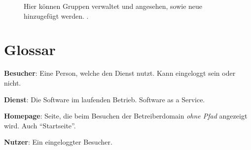 \documentclass[parskip=full,11pt,twoside]{scrartcl}
\begin{document}
\begin{figure}[hb]
		\caption{\label{fig:groups}
			Hier können Gruppen verwaltet und angesehen, sowie neue hinzugefügt werden.
			.
		}
\end{figure}

\section{Glossar}

\textbf{Besucher}:
Eine Person, welche den Dienst nutzt.
Kann eingeloggt sein oder nicht.

\textbf{Dienst}:
Die Software im laufenden Betrieb. Software as a Service.

\textbf{Homepage}:
Seite, die beim Besuchen der Betreiberdomain \emph{ohne Pfad} angezeigt wird. Auch \enquote{Startseite}.

\textbf{Nutzer}:
Ein eingeloggter Besucher.
\end{document}
